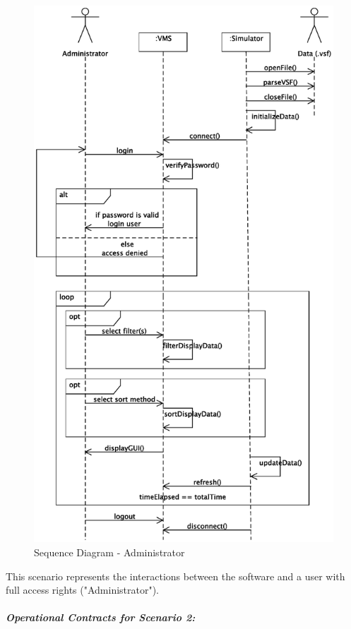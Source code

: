 \documentclass{article}
\begin{document}
\begin{figure}[!htb]
\caption{Sequence Diagram - Administrator}
\centering
\includegraphics[scale=0.6]{diagrams/admin-sequence-diagram.eps}
\end{figure}

This scenario represents the interactions between the software and a user with full access rights ("Administrator").

\subparagraph{Operational Contracts for Scenario 2:}
\end{document}
